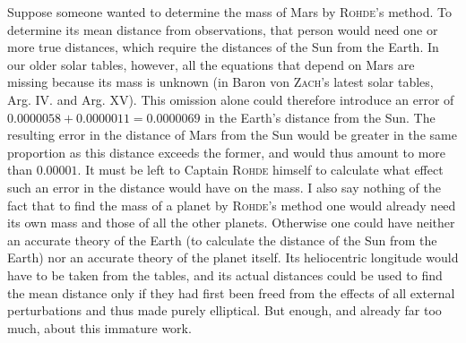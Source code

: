 Suppose someone wanted to determine the mass of Mars by \textsc{Rohde}’s method. To determine its mean distance from observations, that person would need one or more true distances, which require the distances of the Sun from the Earth. In our older solar tables, however, all the equations that depend on Mars are missing because its mass is unknown (in Baron von \textsc{Zach}’s latest solar tables, Arg. IV. and Arg. XV). This omission alone could therefore introduce an error of $0.0000058 + 0.0000011 = 0.0000069$ in the Earth’s distance from the Sun. The resulting error in the distance of Mars from the Sun would be greater in the same proportion as this distance exceeds the former, and would thus amount to more than $0.00001$. It must be left to Captain \textsc{Rohde} himself to calculate what effect such an error in the distance would have on the mass. I also say nothing of the fact that to find the mass of a planet by \textsc{Rohde}’s method one would already need its own mass and those of all the other planets. Otherwise one could have neither an accurate theory of the Earth (to calculate the distance of the Sun from the Earth) nor an accurate theory of the planet itself. Its heliocentric longitude would have to be taken from the tables, and its actual distances could be used to find the mean distance only if they had first been freed from the effects of all external perturbations and thus made purely elliptical. But enough, and already far too much, about this immature work.
